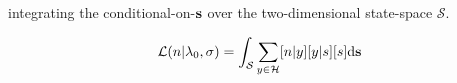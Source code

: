 integrating the conditional-on-$\bf s$ over the two-dimensional
state-space $\mathcal{S}$.

\begin{equation}
  \mathcal{L}(n|\lambda_0, \sigma) = \int_{\mathcal{S}} \sum_{y \in \mathcal{H}} [n|y][y|s][s] \mathrm{d}{\bf s}
  \label{eq:1}
\end{equation}

